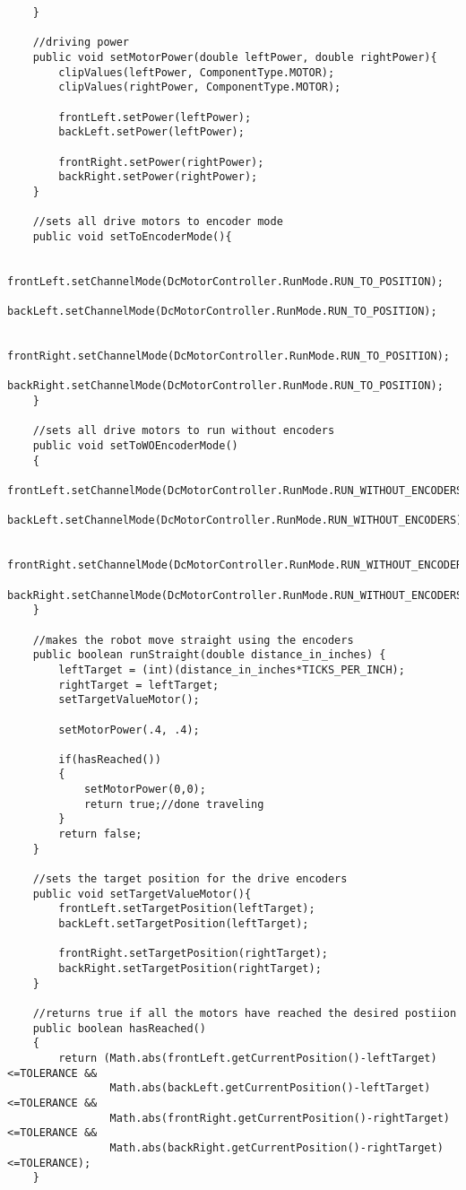 \documentclass[11pt,fleqn]{article}
\begin{document}
\begin{verbatim}
    }

    //driving power
    public void setMotorPower(double leftPower, double rightPower){
        clipValues(leftPower, ComponentType.MOTOR);
        clipValues(rightPower, ComponentType.MOTOR);

        frontLeft.setPower(leftPower);
        backLeft.setPower(leftPower);

        frontRight.setPower(rightPower);
        backRight.setPower(rightPower);
    }

    //sets all drive motors to encoder mode
    public void setToEncoderMode(){

        frontLeft.setChannelMode(DcMotorController.RunMode.RUN_TO_POSITION);
        backLeft.setChannelMode(DcMotorController.RunMode.RUN_TO_POSITION);

        frontRight.setChannelMode(DcMotorController.RunMode.RUN_TO_POSITION);
        backRight.setChannelMode(DcMotorController.RunMode.RUN_TO_POSITION);
    }

    //sets all drive motors to run without encoders
    public void setToWOEncoderMode()
    {
        frontLeft.setChannelMode(DcMotorController.RunMode.RUN_WITHOUT_ENCODERS);
        backLeft.setChannelMode(DcMotorController.RunMode.RUN_WITHOUT_ENCODERS);

        frontRight.setChannelMode(DcMotorController.RunMode.RUN_WITHOUT_ENCODERS);
        backRight.setChannelMode(DcMotorController.RunMode.RUN_WITHOUT_ENCODERS);
    }

    //makes the robot move straight using the encoders
    public boolean runStraight(double distance_in_inches) {
        leftTarget = (int)(distance_in_inches*TICKS_PER_INCH);
        rightTarget = leftTarget;
        setTargetValueMotor();

        setMotorPower(.4, .4);

        if(hasReached())
        {
            setMotorPower(0,0);
            return true;//done traveling
        }
        return false;
    }

    //sets the target position for the drive encoders
    public void setTargetValueMotor(){
        frontLeft.setTargetPosition(leftTarget);
        backLeft.setTargetPosition(leftTarget);

        frontRight.setTargetPosition(rightTarget);
        backRight.setTargetPosition(rightTarget);
    }

    //returns true if all the motors have reached the desired postiion
    public boolean hasReached()
    {
        return (Math.abs(frontLeft.getCurrentPosition()-leftTarget)<=TOLERANCE &&
                Math.abs(backLeft.getCurrentPosition()-leftTarget)<=TOLERANCE &&
                Math.abs(frontRight.getCurrentPosition()-rightTarget)<=TOLERANCE &&
                Math.abs(backRight.getCurrentPosition()-rightTarget)<=TOLERANCE);
    }


\end{verbatim}
\end{document}
